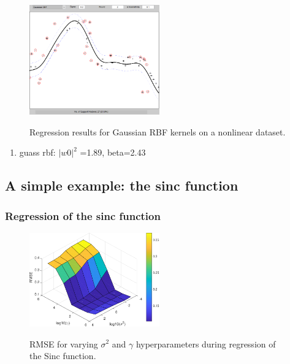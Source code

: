\documentclass{article}
\begin{document}
        \begin{figure}[h]
             \centering
             \centering
             \includegraphics[width=0.5\textwidth]{Assignment 2/figures/1_1/gauss_rbf_sig_0_2_b_2_e_0_1.png}
             \label{fig:gauss_rbf}
            \caption{Regression results for Gaussian RBF kernels on a nonlinear dataset.}
        \end{figure}
        
        \begin{enumerate}
            \item guass rbf: $|w0|^2$ =1.89, beta=2.43
        \end{enumerate}
    
    \subsection{A simple example: the sinc function}
    
        \subsubsection{Regression of the sinc function}
            \begin{figure}[h]
                 \centering
                 \includegraphics[width=0.5\textwidth]{Assignment 2/figures/1_2/hyper_tuning_results.pdf}
                 \label{fig:gauss_rbf}
                \caption{RMSE for varying $\sigma^2$ and $\gamma$ hyperparameters during regression of the Sinc function.}
            \end{figure}
            
\end{document}
